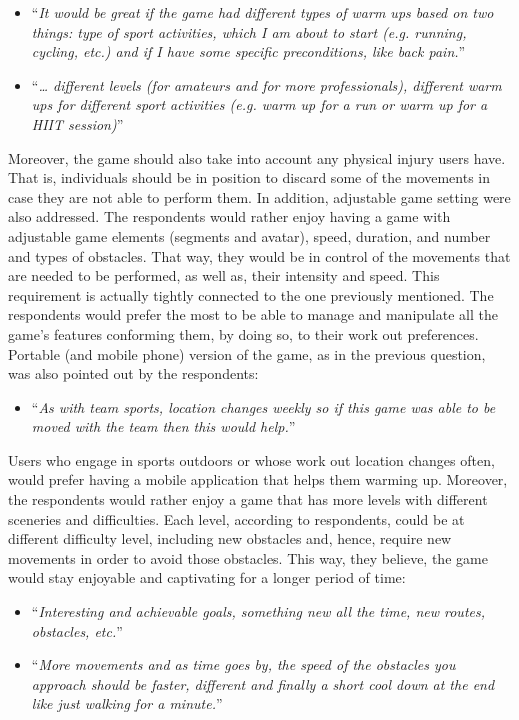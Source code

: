 \begin{itemize}
\item ``\textit{It would be great if the game had different types of warm ups based on two things:  type of sport activities, which I am about to start (e.g. running, cycling, etc.) and if I have some specific preconditions, like back pain.}''
\item ``\textit{… different levels (for amateurs and for more professionals), different warm ups for different sport activities (e.g. warm up for a run or warm up for a HIIT session)}''
\end{itemize}
Moreover, the game should also take into account any physical injury users have. That is, individuals should be in position to discard some of the movements in case they are not able to perform them. In addition, adjustable game setting were also addressed. The respondents would rather enjoy having a game with adjustable game elements (segments and avatar), speed, duration, and number and types of obstacles. That way, they would be in control of the movements that are needed to be performed, as well as, their intensity and speed. This requirement is actually tightly connected to the one previously mentioned. The respondents would prefer the most to be able to manage and manipulate all the game's features conforming them, by doing so, to their work out preferences. Portable (and mobile phone) version of the game, as in the previous question, was also pointed out by the respondents:
\begin{itemize}
\item ``\textit{As with team sports, location changes weekly so if this game was able to be moved with the team then this would help.}''
\end{itemize} 
Users who engage in sports outdoors or whose work out location changes often, would prefer having a mobile application that helps them warming up. Moreover, the respondents would rather enjoy a game that has more levels with different sceneries and difficulties. Each level, according to respondents, could be at different difficulty level, including new obstacles and, hence, require new movements in order to avoid those obstacles. This way, they believe, the game would stay enjoyable and captivating for a longer period of time:
\begin{itemize}
\item ``\textit{Interesting and achievable goals, something new all the time, new routes, obstacles, etc.}''
\item ``\textit{More movements and as time goes by, the speed of the obstacles you approach should be faster, different and finally a short cool down at the end like just walking for a minute.}''
\end{itemize}

